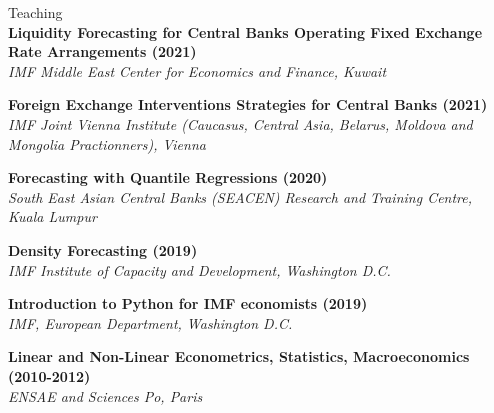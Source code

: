 \documentclass[usegeometry, 10pt, a4paper]{cv} %
\newcommand{\activite}[1]{\textbf{#1}\ }
\begin{document}
\vspace{0.8cm}
\begin{rubriquetableau}[0.95\textwidth]{Teaching}\\

\small
\activite{Liquidity Forecasting for Central Banks Operating Fixed Exchange Rate Arrangements (2021)} \\
\hspace{0.6cm} \small{\emph{IMF Middle East Center for Economics and Finance, Kuwait}}
\vspace{0.4cm}

\small
\activite{Foreign Exchange Interventions Strategies for Central Banks (2021)} \\
\hspace{0.6cm} \small{\emph{IMF Joint Vienna Institute (Caucasus, Central
    Asia, Belarus, Moldova and Mongolia Practionners), Vienna}}
\vspace{0.4cm}

\small
\activite{Forecasting with Quantile Regressions (2020)} \\
\hspace{0.6cm} \small{\emph{South East Asian Central Banks (SEACEN) Research and Training Centre, Kuala Lumpur}}
\vspace{0.4cm}
  
\small
\activite{Density Forecasting (2019)} \\
\hspace{0.6cm} \small{\emph{IMF Institute of Capacity and Development, Washington D.C.}}
\vspace{0.4cm}

\small
\activite{Introduction to Python for IMF economists (2019)} \\
\hspace{0.6cm} \small{\emph{IMF, European Department, Washington D.C.}}
\vspace{0.4cm} 

\small
\activite{Linear and Non-Linear Econometrics, Statistics, Macroeconomics (2010-2012)} \\
\hspace{0.6cm} \small{\emph{ENSAE and Sciences Po, Paris}}
\vspace{0.4cm} 
\end{rubriquetableau}
\end{document}
